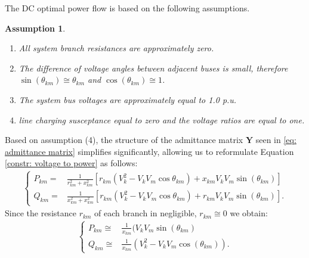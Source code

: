 \documentclass[11pt,a4paper,oneside,openany]{book}
\newtheorem{assumption}{Assumption}
\numberwithin{definition}{section}
\numberwithin{theorem}{section}
\numberwithin{problem}{section}
\begin{document}
The DC optimal power flow is based on the following assumptions.
\begin{assumption}
    \begin{enumerate}
        \item All system branch resistances are approximately zero.
        \item The difference of voltage angles between adjacent buses is small, therefore $\sin(\theta_{km}) \cong \theta_{km}$ and $\cos(\theta_{km}) \cong 1$.
        \item The system bus voltages are approximately equal to 1.0 p.u.
        \item line charging susceptance equal to zero and the voltage ratios are equal to one.
    \end{enumerate}
\end{assumption}

Based on assumption (4), the structure of the admittance matrix $\mathbf{Y}$ seen in \eqref{eq: admittance matrix} simplifies significantly, allowing us to reformulate Equation \ref{constr: voltage to power} as follows:
\begin{align*}
    \left\{
    \begin{aligned}
    P_{km} = & \frac{1}{r_{km}^2+x_{km}^2}[r_{km}(V_k^2-V_kV_m\cos{\theta_{km}})+x_{km}V_kV_m\sin(\theta_{km})] \\
    Q_{km} = & \frac{1}{x_{km}^2+x_{km}^2}[r_{km}(V_k^2-V_kV_m\cos{\theta_{km}})+r_{km}V_kV_m\sin(\theta_{km})].
    \end{aligned}
    \right.
\end{align*}
Since the resistance $r_{km}$ of each branch in negligible,  \(r_{km}\cong 0\) we obtain:
\begin{align*}
    \left\{
    \begin{aligned}
    P_{km} \cong & \frac{1}{x_{km}}(V_kV_m\sin(\theta_{km}) \\
    Q_{km} \cong & \frac{1}{x_{km}}(V_k^2-V_kV_m \cos(\theta_{km})).
    \end{aligned}
    \right.
\end{align*}
\end{document}
